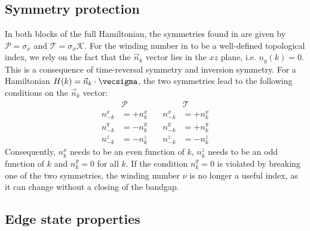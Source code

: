 \subsection{Symmetry protection}
In both blocks of the full Hamiltonian, the symmetries found in  are given by $\mathcal{P} = \sigma_x$ and $\mathcal{T}=\sigma_x \mathcal{K}$.
For the winding number in  to be a well-defined topological index, we rely on the fact that the $\vec{n}_k$ vector lies in the $xz$ plane, i.e. $n_y(k)=0$.
This is a consequence of time-reversal symmetry and inversion symmetry.
For a Hamiltonian $H(k) = \vec{n}_k \cdot \vecsigma$, the two symmetries lead to the following conditions on the $\vec{n}_k$ vector:
\begin{align}
    &\mathcal{P}       &\quad         &\mathcal{T} \\
    n^x_{-k} &= +n^x_k &\quad n^x_{-k} &= +n^x_k \\
    n^y_{-k} &= -n^y_k &\quad n^y_{-k} &= +n^y_k \\
    n^z_{-k} &= -n^z_k &\quad n^z_{-k} &= -n^z_k
\end{align}
Consequently, $n^x_k$ needs to be an even function of $k$, $n^z_k$ needs to be an odd function of $k$ and $n^y_k = 0$ for all $k$.
If the condition $n^y_k = 0$ is violated by breaking one of the two symmetries, the winding number $\nu$ is no longer a useful index, as it can change without a closing of the bandgap.

\subsection{Edge state properties}


